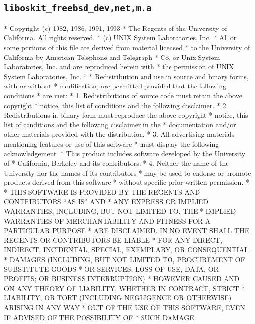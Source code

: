\subsection{\texttt{liboskit_freebsd_dev,net,m.a}}
\begin{copyrightEnv}
 * Copyright (c) 1982, 1986, 1991, 1993
 *      The Regents of the University of California.  All rights reserved.
 * (c) UNIX System Laboratories, Inc.
 * All or some portions of this file are derived from material licensed
 * to the University of California by American Telephone and Telegraph
 * Co. or Unix System Laboratories, Inc. and are reproduced herein with
 * the permission of UNIX System Laboratories, Inc.
 *
 * Redistribution and use in source and binary forms, with or without
 * modification, are permitted provided that the following conditions
 * are met:
 * 1. Redistributions of source code must retain the above copyright
 *    notice, this list of conditions and the following disclaimer.
 * 2. Redistributions in binary form must reproduce the above copyright
 *    notice, this list of conditions and the following disclaimer in the
 *    documentation and/or other materials provided with the distribution.
 * 3. All advertising materials mentioning features or use of this software
 *    must display the following acknowledgement:
 *      This product includes software developed by the University of
 *      California, Berkeley and its contributors.
 * 4. Neither the name of the University nor the names of its contributors
 *    may be used to endorse or promote products derived from this software
 *    without specific prior written permission.
 *
 * THIS SOFTWARE IS PROVIDED BY THE REGENTS AND CONTRIBUTORS ``AS IS'' AND
 * ANY EXPRESS OR IMPLIED WARRANTIES, INCLUDING, BUT NOT LIMITED TO, THE
 * IMPLIED WARRANTIES OF MERCHANTABILITY AND FITNESS FOR A PARTICULAR PURPOSE
 * ARE DISCLAIMED.  IN NO EVENT SHALL THE REGENTS OR CONTRIBUTORS BE LIABLE
 * FOR ANY DIRECT, INDIRECT, INCIDENTAL, SPECIAL, EXEMPLARY, OR CONSEQUENTIAL
 * DAMAGES (INCLUDING, BUT NOT LIMITED TO, PROCUREMENT OF SUBSTITUTE GOODS
 * OR SERVICES; LOSS OF USE, DATA, OR PROFITS; OR BUSINESS INTERRUPTION)
 * HOWEVER CAUSED AND ON ANY THEORY OF LIABILITY, WHETHER IN CONTRACT, STRICT
 * LIABILITY, OR TORT (INCLUDING NEGLIGENCE OR OTHERWISE) ARISING IN ANY WAY
 * OUT OF THE USE OF THIS SOFTWARE, EVEN IF ADVISED OF THE POSSIBILITY OF
 * SUCH DAMAGE.
\end{copyrightEnv}

